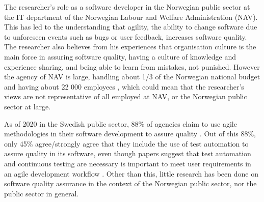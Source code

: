 
The researcher's role as a software developer in the Norwegian public sector at the IT department of the Norwegian Labour and Welfare Administration (NAV). This has led to the understanding that agility, the ability to change software due to unforeseen events such as bugs or user feedback, increases software quality. The researcher also believes from his experiences that organisation culture is the main force in assuring software quality, having a culture of knowledge and experience sharing, and being able to learn from mistakes, not punished. However the agency of NAV is large, handling about 1/3 of the Norwegian national budget \cite{okp_nav_r_2022}\cite{bud_r_2021} and having about 22 000 employees \cite{org_nav_2023}, which could mean that the researcher's views are not representative of all employed at NAV, or the Norwegian public sector at large.

As of 2020 in the Swedish public sector, 88\% of agencies claim to use agile methodologies in their software development to assure quality \cite{mb_2020}. Out of this 88\%, only 45\% agree/strongly agree that they include the use of test automation to assure quality in its software, even though papers suggest that test automation and continuous testing are necessary is important to meet user requirements in an agile development workflow \cite{vk_2010}. Other than this, little research has been done on software quality assurance in the context of the Norwegian public sector, nor the public sector in general. 


